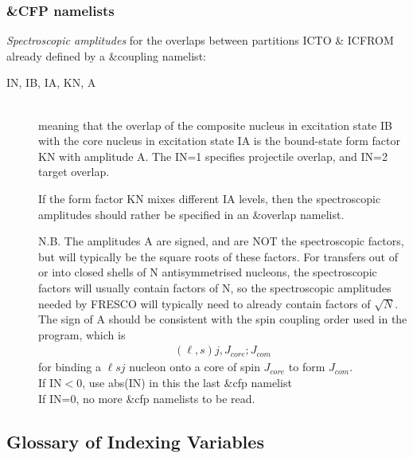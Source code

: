 \documentclass[11pt]{article}
\newcommand{\beqn}{\begin{eqnarray}}
\newcommand{\eeqn}{\end{eqnarray}}
\begin{document}
\subsubsection{\&CFP namelists}
  {\em Spectroscopic amplitudes} {\rm for the overlaps between
partitions ICTO \& ICFROM already defined by a \&coupling namelist}:
\begin{description}
\item[IN, IB, IA, KN,  A] ~\\
%
meaning that the overlap of the composite nucleus in excitation
state IB with the core nucleus in excitation state IA is the
bound-state form factor KN with amplitude A. The IN=1 specifies
projectile overlap, and IN=2 target overlap.

 If the form factor KN mixes different IA levels, then the spectroscopic
 amplitudes should rather be specified in an \&overlap namelist.

N.B. The amplitudes A are signed, and are NOT the spectroscopic
factors, but will typically be the square roots of these factors.
For transfers out of or into closed shells of N antisymmetrised nucleons,
the spectroscopic factors will usually contain factors of N,
so the spectroscopic amplitudes needed by FRESCO will typically 
need to already contain factors of $\sqrt{N}$.
\\
The sign of A should be consistent with the spin coupling order used in
the program, which is
\beqn
  (\ell,s)j, J_{core}; J_{com}
\eeqn
for binding a $\ell sj$ nucleon onto a core of spin $J_{core}$ to form $J_{com}$.
\\
 If IN$<$0, use abs(IN) in this the last \&cfp namelist\\
 If IN=0, no more \&cfp namelists to be read.
\end{description}

%
%

\subsection*{Glossary of Indexing Variables}
%
\end{document}
